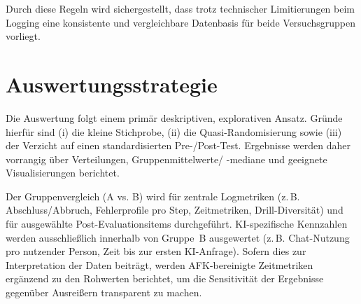 Durch diese Regeln wird sichergestellt, dass trotz technischer Limitierungen beim Logging eine konsistente und vergleichbare Datenbasis für beide Versuchsgruppen vorliegt.

\section{Auswertungsstrategie}\label{sec:auswertungsstrategie}

Die Auswertung folgt einem primär deskriptiven, explorativen Ansatz. Gründe hierfür sind (i) die kleine Stichprobe, (ii) die Quasi-Randomisierung sowie (iii) der Verzicht auf einen standardisierten Pre-/Post-Test. Ergebnisse werden daher vorrangig über Verteilungen, Gruppenmittelwerte/ -mediane und geeignete Visualisierungen berichtet.

Der Gruppenvergleich (A vs. B) wird für zentrale Logmetriken (z.\,B. Abschluss/Abbruch, Fehlerprofile pro Step, Zeitmetriken, Drill-Diversität) und für ausgewählte Post-Evaluationsitems durchgeführt. KI-spezifische Kennzahlen werden ausschließlich innerhalb von Gruppe~B ausgewertet (z.\,B. Chat-Nutzung pro nutzender Person, Zeit bis zur ersten KI-Anfrage). Sofern dies zur Interpretation der Daten beiträgt, werden AFK-bereinigte Zeitmetriken ergänzend zu den Rohwerten berichtet, um die Sensitivität der Ergebnisse gegenüber Ausreißern transparent zu machen.



